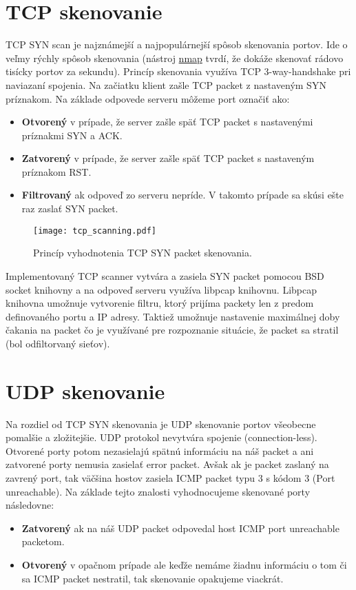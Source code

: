 \documentclass[a4paper, 11pt]{article}
\begin{document}
\section{TCP skenovanie}\label{sec_tcp_scanner}
TCP SYN scan je najznámejší a najpopulárnejší spôsob skenovania portov. Ide o veľmy rýchly spôsob skenovania (nástroj \href{https://nmap.org/book/synscan.html}{nmap} tvrdí, že dokáže skenovať rádovo tisícky portov za sekundu). Princíp skenovania využíva TCP 3-way-handshake pri naviazaní spojenia. Na začiatku klient zašle TCP packet z nastaveným SYN príznakom. \cite{nmap_book} Na základe odpovede serveru môžeme port označiť ako:
\begin{itemize}
	\item \textbf{Otvorený} v prípade, že server zašle späť TCP packet s nastavenými príznakmi SYN a ACK.
	\item \textbf{Zatvorený} v prípade, že server zašle späť TCP packet s nastaveným príznakom RST.
	\item \textbf{Filtrovaný} ak odpoveď zo serveru nepríde. V takomto prípade sa skúsi ešte raz zaslať SYN packet.
\end{itemize}
\begin{figure}[H] 
\centering
\texttt{[image: tcp\_scanning.pdf]}
\caption{Princíp vyhodnotenia TCP SYN packet skenovania.}
\label{obr1}
\end{figure} 

Implementovaný TCP scanner vytvára a zasiela SYN packet pomocou BSD socket knihovny a na odpoveď serveru využíva libpcap knihovnu. Libpcap knihovna umožnuje vytvorenie filtru, ktorý prijíma packety len z predom definovaného portu a IP adresy. Taktiež umožnuje nastavenie maximálnej doby čakania na packet čo je využívané pre rozpoznanie situácie, že packet sa stratil (bol odfiltorvaný sieťov).

\section{UDP skenovanie}\label{sec_udp_scanner}
Na rozdiel od TCP SYN skenovania je UDP skenovanie portov všeobecne pomalšie a zložitejšie. UDP protokol nevytvára spojenie (connection-less). Otvorené porty potom nezasielajú spätnú informáciu na náš packet a ani zatvorené porty nemusia zasielať error packet. Avšak ak je packet zaslaný na zavrený port, tak väčšina hostov zasiela ICMP packet typu 3 s kódom 3 (Port unreachable). \cite{nmap_book} Na základe tejto znalosti vyhodnocujeme skenované porty následovne:
\begin{itemize}
	\item \textbf{Zatvorený} ak na náš UDP packet odpovedal host ICMP port unreachable packetom.
	\item \textbf{Otvorený} v opačnom prípade ale keďže nemáme žiadnu informáciu o tom či sa ICMP packet nestratil, tak skenovanie opakujeme viackrát.
\end{itemize}
\end{document}
